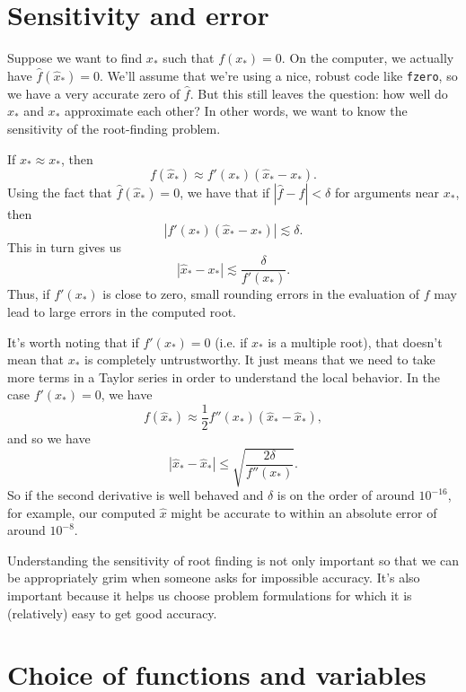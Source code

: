 \documentclass[12pt, leqno]{article} %
\begin{document}
\section*{Sensitivity and error}


Suppose we want to find $x_*$ such that $f(x_*) = 0$.  On the
computer, we actually have $\hat{f}(\hat{x}_*) = 0$.  We'll assume
that we're using a nice, robust code like {\tt fzero}, so we have a
very accurate zero of $\hat{f}$.  But this still leaves the question:
how well do $\hat{x}_*$ and $x_*$ approximate each other?
In other words, we want to know the sensitivity of the root-finding
problem.

If $\hat{x}_* \approx x_*$, then
\[
  f(\hat{x}_*) \approx f'(x_*) (\hat{x}_*-x_*).
\]
Using the fact that $\hat{f}(\hat{x}_*) = 0$, we have that if
$|\hat{f}-f| < \delta$ for arguments near $x_*$, then
\[
  |f'(x_*) (\hat{x}_*-x_*)| \lesssim \delta.
\]
This in turn gives us
\[
  |\hat{x}_*-x_*| \lesssim \frac{\delta}{f'(x_*)}.
\]
Thus, if $f'(x_*)$ is close to zero, small rounding errors in the
evaluation of $f$ may lead to large errors in the computed root.

It's worth noting that if $f'(x_*) = 0$ (i.e. if $x_*$ is a multiple
root), that doesn't mean that $x_*$ is completely untrustworthy.  It
just means that we need to take more terms in a Taylor series in order
to understand the local behavior.  In the case $f'(x_*) = 0$, we have
\[
  f(\hat{x}_*) \approx \frac{1}{2} f''(x_*) (\hat{x}_*-\hat{x}_*),
\]
and so we have
\[
  |\hat{x}_*-\hat{x}_*| \leq \sqrt{\frac{2\delta}{f''(x_*)}}.
\]
So if the second derivative is well behaved and $\delta$ is on the
order of around $10^{-16}$, for example, our computed $\hat{x}$ might
be accurate to within an absolute error of around $10^{-8}$.

Understanding the sensitivity of root finding is not only important so
that we can be appropriately grim when someone asks for impossible
accuracy.  It's also important because it helps us choose problem
formulations for which it is (relatively) easy to get good accuracy.

\section*{Choice of functions and variables}
\end{document}

